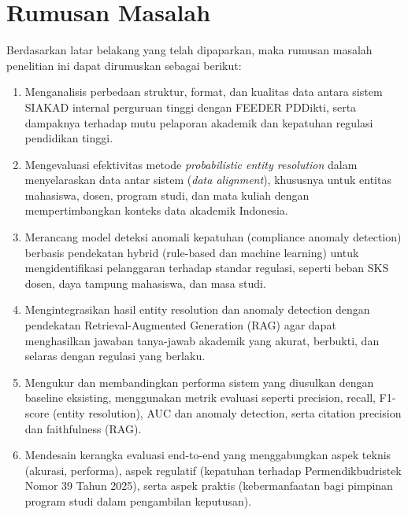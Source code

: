 \documentclass[12pt,a4paper,oneside]{report}
\begin{document}
        \section{Rumusan Masalah}
            Berdasarkan latar belakang yang telah dipaparkan, maka rumusan masalah penelitian ini dapat dirumuskan sebagai berikut:
            \begin{enumerate}
                \item Menganalisis perbedaan struktur, format, dan kualitas data antara sistem SIAKAD internal perguruan tinggi dengan FEEDER PDDikti, serta dampaknya terhadap mutu pelaporan akademik dan kepatuhan regulasi pendidikan tinggi.
                
                \item Mengevaluasi efektivitas metode \textit{probabilistic entity resolution} dalam menyelaraskan data antar sistem (\textit{data alignment}),
                    khususnya untuk entitas mahasiswa, dosen, program studi, dan mata kuliah dengan mempertimbangkan konteks data akademik Indonesia.
                \item Merancang model deteksi anomali kepatuhan (compliance anomaly detection) berbasis pendekatan hybrid (rule-based dan machine learning) untuk mengidentifikasi pelanggaran terhadap standar regulasi, seperti beban SKS dosen, daya tampung mahasiswa, dan masa studi.
                \item Mengintegrasikan hasil entity resolution dan anomaly detection dengan pendekatan Retrieval-Augmented Generation (RAG) agar dapat menghasilkan jawaban tanya-jawab akademik yang akurat, berbukti, dan selaras dengan regulasi yang berlaku.
                \item Mengukur dan membandingkan performa sistem yang diusulkan dengan baseline eksisting, menggunakan metrik evaluasi seperti precision, recall, F1-score (entity resolution), AUC dan anomaly detection, serta citation precision dan faithfulness (RAG).
                \item Mendesain kerangka evaluasi end-to-end yang menggabungkan aspek teknis (akurasi, performa), aspek regulatif (kepatuhan terhadap Permendikbudristek Nomor 39 Tahun 2025), serta aspek praktis (kebermanfaatan bagi pimpinan program studi dalam pengambilan keputusan).
            \end{enumerate}
\end{document}
